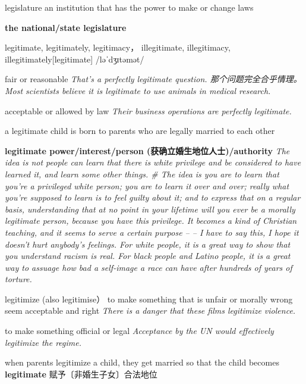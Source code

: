 \begin{DefWord}{legislature}
    an institution that has the power to make or change laws

    \textbf{the national/state legislature}
\end{DefWord}

\begin{DefWord}{legitimate, legitimately, legitimacy， illegitimate, illegitimacy, illegitimately}[legitimate]
    /ləˈdʒɪtəmət/

    fair or reasonable
    \textit{That's a perfectly legitimate question. 那个问题完全合乎情理。}
    \textit{Most scientists believe it is legitimate to use animals in medical research.}

    acceptable or allowed by law
    \textit{Their business operations are perfectly legitimate.}

    a legitimate child is born to parents who are legally married to each other

    \textbf{legitimate power/interest/person (获确立婚生地位人士)/authority}
    \textit{The idea is not people can learn that there is white privilege and be considered to have learned it, and learn some other things. \# The idea is you are to learn that you're a privileged white person; you are to learn it over and over; really what you're supposed to learn is to feel guilty about it; and to express that on a regular basis, understanding that at no point in your lifetime will you ever be a morally legitimate person, because you have this privilege. It becomes a kind of Christian teaching, and it seems to serve a certain purpose -- -- I have to say this, I hope it doesn't hurt anybody's feelings. For white people, it is a great way to show that you understand racism is real. For black people and Latino people, it is a great way to assuage how bad a self-image a race can have after hundreds of years of torture. }
\end{DefWord}

\begin{DefWord}{legitimize (also legitimise）}
    to make something that is unfair or morally wrong seem acceptable and right
    \textit{There is a danger that these films legitimize violence.}

    to make something official or legal
    \textit{Acceptance by the UN would effectively legitimize the regime.}

    when parents legitimize a child, they get married so that the child becomes \textbf{legitimate} 赋予〔非婚生子女〕合法地位

\end{DefWord}

